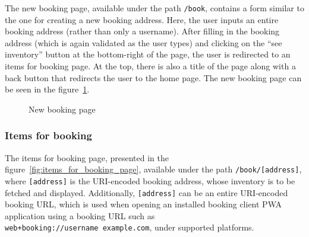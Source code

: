 The new booking page, available under the path \texttt{/book}, contains a form similar to the one for creating a new booking address. Here, the user inputs an entire booking address (rather than only a username). After filling in the booking address (which is again validated as the user types) and clicking on the \enquote{see inventory} button at the bottom-right of the page, the user is redirected to an items for booking page. At the top, there is also a title of the page along with a back button that redirects the user to the home page. The new booking page can be seen in the figure~\ref{fig:new_booking_page}.

\begin{figure}
    \centering
    \caption[New booking page]{New booking page}
    \label{fig:new_booking_page}
\end{figure}

\subsubsection{Items for booking}

The items for booking page, presented in the figure~\ref{fig:items_for_booking_page}, available under the path \texttt{/book/[address]}, where \texttt{[address]} is the URI-encoded booking address, whose inventory is to be fetched and displayed. Additionally, \texttt{[address]} can be an entire URI-encoded booking URL, which is used when opening an installed booking client PWA application using a booking URL such as \texttt{web+booking://username~example.com}, under supported platforms.

